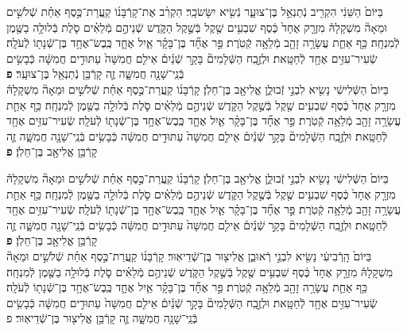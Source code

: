 \documentclass[twoside, openany, parskip=half, 11pt]{book}
\begin{document}
\begin{footnotesize}
\begin{multicols}{2}
בַּיּוֹם֙ הַשֵּׁנִ֔י הִקְרִ֖יב נְֿתַנְאֵ֣ל בֶּן־צוּעָ֑ר נְֿשִׂ֖יא יִשָּׂשׂכָֽר׃ הִקְרִ֨ב אֶת־קָרְֿבָּנ֜וֹ קַֽעֲרַת־כֶּ֣סֶף אַחַ֗ת שְֿׁלֹשִׁ֣ים וּמֵאָה֘ מִשְׁקָלָהּ֒ מִזְרָ֤ק אֶחָד֙ כֶּ֔סֶף שִׁבְעִ֥ים שֶׁ֖קֶל בְּֿשֶׁ֣קֶל הַקֹּ֑דֶשׁ שְֿׁנֵיהֶ֣ם מְֿלֵאִ֗ים סֹ֛לֶת בְּֿלוּלָ֥ה בַשֶּׁ֖מֶן לְֿמִנְחָֽה׃ כַּ֥ף אַחַ֛ת עֲשָׂרָ֥ה זָהָ֖ב מְֿלֵאָ֥ה קְֿטֹֽרֶת׃  פַּ֣ר אֶחָ֞ד בֶּן־בָּקָ֗ר אַ֧יִל אֶחָ֛ד כֶּֽבֶשׂ־אֶחָ֥ד בֶּן־שְֿׁנָת֖וֹ לְֿעֹלָֽה׃ שְֿׂעִיר־עִזִּ֥ים אֶחָ֖ד לְֿחַטָּֽאת׃ וּלְזֶ֣בַֽח הַשְּֿׁלָמִים֘ בָּקָ֣ר שְֿׁנַ֒יִם֒ אֵילִ֤ם חֲמִשָּׁה֙ עַתּוּדִ֣ים חֲמִשָּׁ֔ה כְּֿבָשִׂ֥ים בְּֿנֵֽי־שָׁנָ֖ה חֲמִשָּׁ֑ה זֶ֛ה קָרְֿבַּ֥ן נְֿתַנְאֵ֖ל בֶּן־צוּעָֽר׃ \textbf{פ} \\
בַּיּוֹם֙ הַשְּֿׁלִישִׁ֔י נָשִׂ֖יא לִבְנֵ֣י זְֿבוּלֻ֑ן אֱלִיאָ֖ב בֶּן־חֵלֹֽן׃ קָרְֿבָּנ֜וֹ קַֽעֲרַת־כֶּ֣סֶף אַחַ֗ת שְֿׁלֹשִׁ֣ים וּמֵאָה֘ מִשְׁקָלָהּ֒ מִזְרָ֤ק אֶחָד֙ כֶּ֔סֶף שִׁבְעִ֥ים שֶׁ֖קֶל בְּֿשֶׁ֣קֶל הַקֹּ֑דֶשׁ שְֿׁנֵיהֶ֣ם מְֿלֵאִ֗ים סֹ֛לֶת בְּֿלוּלָ֥ה בַשֶּׁ֖מֶן לְֿמִנְחָֽה׃ כַּ֥ף אַחַ֛ת עֲשָׂרָ֥ה זָהָ֖ב מְֿלֵאָ֥ה קְֿטֹֽרֶת׃ פַּ֣ר אֶחָ֞ד בֶּן־בָּקָ֗ר אַ֧יִל אֶחָ֛ד כֶּֽבֶשׂ־אֶחָ֥ד בֶּן־שְֿׁנָת֖וֹ לְֿעֹלָֽה׃ שְֿׂעִיר־עִזִּ֥ים אֶחָ֖ד לְֿחַטָּֽאת׃ וּלְזֶ֣בַֽח הַשְּֿׁלָמִים֘ בָּקָ֣ר שְֿׁנַ֒יִם֒ אֵילִ֤ם חֲמִשָּׁה֙ עַתּוּדִ֣ים חֲמִשָּׁ֔ה כְּֿבָשִׂ֥ים בְּֿנֵֽי־שָׁנָ֖ה חֲמִשָּׁ֑ה זֶ֛ה קָרְֿבַּ֥ן אֱלִיאָ֖ב בֶּן־חֵלֹֽן׃ \textbf{פ}


בַּיּוֹם֙ הַשְּֿׁלִישִׁ֔י נָשִׂ֖יא לִבְנֵ֣י זְֿבוּלֻ֑ן אֱלִיאָ֖ב בֶּן־חֵלֹֽן׃ קָרְֿבָּנ֜וֹ קַֽעֲרַת־כֶּ֣סֶף אַחַ֗ת שְֿׁלֹשִׁ֣ים וּמֵאָה֘ מִשְׁקָלָהּ֒ מִזְרָ֤ק אֶחָד֙ כֶּ֔סֶף שִׁבְעִ֥ים שֶׁ֖קֶל בְּֿשֶׁ֣קֶל הַקֹּ֑דֶשׁ שְֿׁנֵיהֶ֣ם מְֿלֵאִ֗ים סֹ֛לֶת בְּֿלוּלָ֥ה בַשֶּׁ֖מֶן לְֿמִנְחָֽה׃ כַּ֥ף אַחַ֛ת עֲשָׂרָ֥ה זָהָ֖ב מְֿלֵאָ֥ה קְֿטֹֽרֶת׃  פַּ֣ר אֶחָ֞ד בֶּן־בָּקָ֗ר אַ֧יִל אֶחָ֛ד כֶּֽבֶשׂ־אֶחָ֥ד בֶּן־שְֿׁנָת֖וֹ לְֿעֹלָֽה׃ שְֿׂעִיר־עִזִּ֥ים אֶחָ֖ד לְֿחַטָּֽאת׃ וּלְזֶ֣בַֽח הַשְּֿׁלָמִים֘ בָּקָ֣ר שְֿׁנַ֒יִם֒ אֵילִ֤ם חֲמִשָּׁה֙ עַתּוּדִ֣ים חֲמִשָּׁ֔ה כְּֿבָשִׂ֥ים בְּֿנֵֽי־שָׁנָ֖ה חֲמִשָּׁ֑ה זֶ֛ה קָרְֿבַּ֥ן אֱלִיאָ֖ב בֶּן־חֵלֹֽן׃ \textbf{פ} \\
 בַּיּוֹם֙ הָֽרְֿבִיעִ֔י נָשִׂ֖יא לִבְנֵ֣י רְֿאוּבֵ֑ן אֱלִיצ֖וּר בֶּן־שְֿׁדֵיאֽוּר׃ קָרְֿבָּנ֜וֹ קַֽעֲרַת־כֶּ֣סֶף אַחַ֗ת שְֿׁלֹשִׁ֣ים וּמֵאָה֘ מִשְׁקָלָהּ֒ מִזְרָ֤ק אֶחָד֙ כֶּ֔סֶף שִׁבְעִ֥ים שֶׁ֖קֶל בְּֿשֶׁ֣קֶל הַקֹּ֑דֶשׁ שְֿׁנֵיהֶ֣ם מְֿלֵאִ֗ים סֹ֛לֶת בְּֿלוּלָ֥ה בַשֶּׁ֖מֶן לְֿמִנְחָֽה׃ כַּ֥ף אַחַ֛ת עֲשָׂרָ֥ה זָהָ֖ב מְֿלֵאָ֥ה קְֿטֹֽרֶת׃ פַּ֣ר אֶחָ֞ד בֶּן־בָּקָ֗ר אַ֧יִל אֶחָ֛ד כֶּֽבֶשׂ־אֶחָ֥ד בֶּן־שְֿׁנָת֖וֹ לְֿעֹלָֽה׃ שְֿׂעִיר־עִזִּ֥ים אֶחָ֖ד לְֿחַטָּֽאת׃ וּלְזֶ֣בַֽח הַשְּֿׁלָמִים֘ בָּקָ֣ר שְֿׁנַ֒יִם֒ אֵילִ֤ם חֲמִשָּׁה֙ עַתּוּדִ֣ים חֲמִשָּׁ֔ה כְּֿבָשִׂ֥ים בְּֿנֵֽי־שָׁנָ֖ה חֲמִשָּׁ֑ה זֶ֛ה קָרְֿבַּ֥ן אֱלִיצ֖וּר בֶּן־שְֿׁדֵיאֽוּר׃ פ


\end{multicols}
\end{footnotesize}
\end{document}
